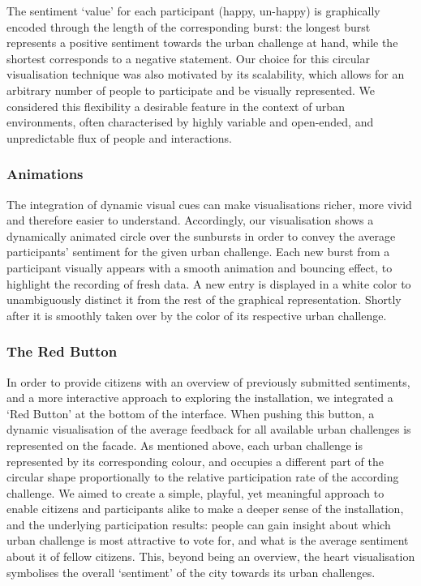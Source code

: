 The sentiment ‘value’ for each participant (happy, un-happy) is graphically encoded through the length of the corresponding burst: the longest burst represents a positive sentiment towards the urban challenge at hand, while the shortest corresponds to a negative statement. Our choice for this circular visualisation technique was also motivated by its scalability, which allows for an arbitrary number of people to participate and be visually represented. We considered this flexibility a desirable feature in the context of urban environments, often characterised by highly variable and open-ended, and unpredictable flux of people and interactions.

\subsubsection*{Animations}

The integration of dynamic visual cues can make visualisations richer, more vivid and therefore easier to understand. Accordingly, our visualisation shows a dynamically animated circle over the sunbursts in order to convey the average participants’ sentiment for the given urban challenge. Each new burst from a participant visually appears with a smooth animation and bouncing effect, to highlight the recording of fresh data. A new entry is displayed in a white color to unambiguously distinct it from the rest of the graphical representation. Shortly after it is smoothly taken over by the color of its respective urban challenge.

\subsubsection*{The Red Button}

In order to provide citizens with an overview of previously submitted sentiments, and a more interactive approach to exploring the installation, we integrated a ‘Red Button’ at the bottom of the interface. When pushing this button, a dynamic visualisation of the average feedback for all available urban challenges is represented on the facade. As mentioned above, each urban challenge is represented by its corresponding colour, and occupies a different part of the circular shape proportionally to the relative participation rate of the according challenge. We aimed to create a simple, playful, yet meaningful approach to enable citizens and participants alike to make a deeper sense of the installation, and the underlying participation results: people can gain insight about which urban challenge is most attractive to vote for, and what is the average sentiment about it of fellow citizens. This, beyond being an overview, the heart visualisation symbolises the overall ‘sentiment’ of the city towards its urban challenges.

